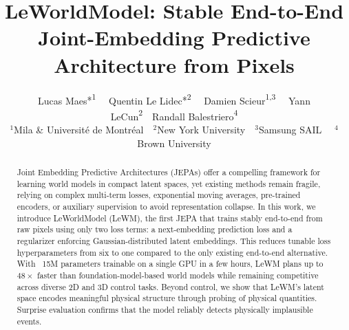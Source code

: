 \documentclass{article}
\title{LeWorldModel: Stable End-to-End Joint-Embedding Predictive Architecture from Pixels}
\author{%
Lucas Maes\textnormal{*\textsuperscript{1}}~~ Quentin Le Lidec\textnormal{*\textsuperscript{2}}~~ Damien Scieur\textnormal{\textsuperscript{1,3}}~~ Yann LeCun\textnormal{\textsuperscript{2}}~~Randall Balestriero\textnormal{\textsuperscript{4}}
\\[8pt]
$^{1}$Mila \& Université de Montréal~~$^{2}$New York University~~$^{3}$Samsung SAIL ~~$^{4}$Brown University
}
\begin{document}
\renewcommand{\thefootnote}{}
\renewcommand{\thefootnote}{\arabic{footnote}}

\maketitle

\vspace{-2.5em}
\begin{center}
\href{https://le-wm.github.io}{%
  }
\href{https://github.com/lucas-maes/le-wm}{%
  }
\end{center}
\vspace{2pt}

\begin{abstract}
Joint Embedding Predictive Architectures (JEPAs) offer a compelling framework for learning world models in compact latent spaces, yet existing methods remain fragile, relying on complex multi-term losses, exponential moving averages, pre-trained encoders, or auxiliary supervision to avoid representation collapse. In this work, we introduce LeWorldModel (LeWM), the first JEPA that trains stably end-to-end from raw pixels using only two loss terms: a next-embedding prediction loss and a regularizer enforcing Gaussian-distributed latent embeddings. This reduces tunable loss hyperparameters from six to one compared to the only existing end-to-end alternative. With ~15M parameters trainable on a single GPU in a few hours, LeWM plans up to $48\times$ faster than foundation-model-based world models while remaining competitive across diverse 2D and 3D control tasks. Beyond control, we show that LeWM's latent space encodes meaningful physical structure through probing of physical quantities. Surprise evaluation confirms that the model reliably detects physically implausible events.
\end{abstract}
\end{document}

